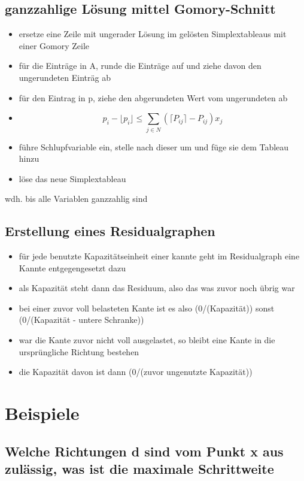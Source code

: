 \documentclass[12pt,a4paper, hyperref]{article}
\begin{document}
\subsection{ganzzahlige Lösung mittel Gomory-Schnitt}
\begin{itemize}
\item ersetze eine Zeile mit ungerader Lösung im gelösten Simplextableaus mit einer Gomory Zeile
\item für die Einträge in A, runde die Einträge auf und ziehe davon den ungerundeten Einträg ab
\item für den Eintrag in p, ziehe den abgerundeten Wert vom ungerundeten ab
\item \[ p_i - \lfloor p_i \rfloor \leq \sum_{j\in N} (\lceil P_{ij} \rceil - P_{ij})x_j \]
\item führe Schlupfvariable ein, stelle nach dieser um und füge sie dem Tableau hinzu
\item löse das neue Simplextableau
\end{itemize}
wdh. bis alle Variablen ganzzahlig sind


\subsection{Erstellung eines Residualgraphen}
\begin{itemize}
\item für jede benutzte Kapazitätseinheit einer kannte geht im Residualgraph eine Kannte entgegengesetzt dazu
\item als Kapazität steht dann das Residuum, also das was zuvor noch übrig war
\item bei einer zuvor voll belasteten Kante ist es also (0/(Kapazität)) sonst (0/(Kapazität - untere Schranke))
\item war die Kante zuvor nicht voll ausgelastet, so bleibt eine Kante in die ursprüngliche Richtung bestehen
\item die Kapazität davon ist dann (0/(zuvor ungenutzte Kapazität))
\end{itemize}

\section{Beispiele}
\subsection{Welche Richtungen d sind vom Punkt x aus zulässig, was ist die maximale Schrittweite}
\end{document}
